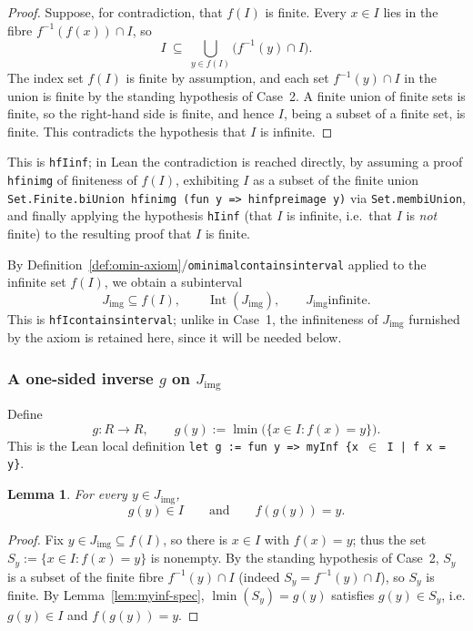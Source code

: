 \documentclass[11pt]{article}
\newtheorem{lemma}[definition]{Lemma}
\newcommand{\Lean}[1]{\texttt{\begingroup\def\_{\textunderscore\discretionary{}{}{}}#1\endgroup}}
\newcommand{\lmin}{\operatorname{lmin}}
\newcommand{\Int}{\operatorname{Int}}
\begin{document}
\begin{proof}
Suppose, for contradiction, that $f(I)$ is finite. Every $x\in I$ lies in the fibre
$f^{-1}(f(x))\cap I$, so
\[
  I \ \subseteq\ \bigcup_{y\in f(I)} \bigl(f^{-1}(y)\cap I\bigr).
\]
The index set $f(I)$ is finite by assumption, and each set $f^{-1}(y)\cap I$ in the union is
finite by the standing hypothesis of Case~2. A finite union of finite sets is finite, so the
right-hand side is finite, and hence $I$, being a subset of a finite set, is finite. This
contradicts the hypothesis that $I$ is infinite.
\end{proof}
 
This is \Lean{h\_fI\_inf}; in Lean the contradiction is reached directly, by assuming a proof
\Lean{h\_fin\_img} of finiteness of $f(I)$, exhibiting $I$ as a subset of the finite union
\Lean{Set.Finite.biUnion h\_fin\_img (fun y \_ => h\_inf\_preimage y)} via
\Lean{Set.mem\_biUnion}, and finally applying the hypothesis \Lean{hI\_inf} (that $I$ is infinite,
i.e.\ that $I$ is \emph{not} finite) to the resulting proof that $I$ is finite.
 
By Definition~\ref{def:omin-axiom}/\Lean{o\_minimal\_contains\_interval} applied to the infinite
set $f(I)$, we obtain a subinterval
\[
  J_{\mathrm{img}}\subseteq f(I), \qquad \Int(J_{\mathrm{img}}), \qquad J_{\mathrm{img}}\text{
  infinite}.
\]
This is \Lean{h\_fI\_contains\_interval}; unlike in Case~1, the infiniteness of $J_{\mathrm{img}}$
furnished by the axiom is retained here, since it will be needed below.
 
\subsubsection{A one-sided inverse $g$ on $J_{\mathrm{img}}$}
 
Define
\[
  g:R\to R,\qquad g(y) := \lmin\bigl(\{x\in I : f(x)=y\}\bigr).
\]
This is the Lean local definition \Lean{let g := fun y => myInf \{x \(\in\) I | f x = y\}}.
 
\begin{lemma}\label{lem:g-properties}
For every $y\in J_{\mathrm{img}}$,
\[
  g(y)\in I \qquad\text{and}\qquad f(g(y)) = y.
\]
\end{lemma}
 
\begin{proof}
Fix $y\in J_{\mathrm{img}}\subseteq f(I)$, so there is $x\in I$ with $f(x)=y$; thus the set
$S_y:=\{x\in I: f(x)=y\}$ is nonempty. By the standing hypothesis of Case~2, $S_y$ is a subset of
the finite fibre $f^{-1}(y)\cap I$ (indeed $S_y = f^{-1}(y)\cap I$), so $S_y$ is finite. By
Lemma~\ref{lem:myinf-spec}, $\lmin(S_y) = g(y)$ satisfies $g(y)\in S_y$, i.e. $g(y)\in I$ and
$f(g(y))=y$.
\end{proof}
 
\end{document}

